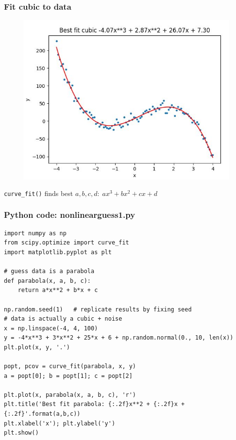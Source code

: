 \documentclass[english,14pt]{beamer}
\begin{document}

\begin{frame}[fragile]

\frametitle{Fit cubic to data}

\vspace*{-5mm}
\begin{figure}[ht]
	\centering
	\includegraphics[width=.7\textwidth]{figures/nonlinearguess2output}
\end{figure}
\vspace*{-5mm}
\texttt{curve\_fit()} finds best $a, b, c, d: \; ax^3 + bx^2 + cx + d$

\end{frame}


\begin{frame}[fragile]

\frametitle{Python code: nonlinearguess1.py}

\vspace*{-3mm}

\begin{lstlisting}[style=CStyle,basicstyle=\scriptsize]
import numpy as np
from scipy.optimize import curve_fit
import matplotlib.pyplot as plt

# guess data is a parabola
def parabola(x, a, b, c):
    return a*x**2 + b*x + c

np.random.seed(1)   # replicate results by fixing seed
# data is actually a cubic + noise
x = np.linspace(-4, 4, 100)
y = -4*x**3 + 3*x**2 + 25*x + 6 + np.random.normal(0., 10, len(x))
plt.plot(x, y, '.')

popt, pcov = curve_fit(parabola, x, y)
a = popt[0]; b = popt[1]; c = popt[2]

plt.plot(x, parabola(x, a, b, c), 'r')
plt.title('Best fit parabola: {:.2f}x**2 + {:.2f}x + {:.2f}'.format(a,b,c))
plt.xlabel('x'); plt.ylabel('y')
plt.show()
\end{lstlisting}

\end{frame}
\end{document}
